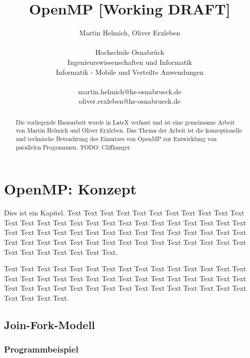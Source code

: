 \documentclass{lni}
\begin{document}
\author{
	Martin Helmich, Oliver Erxleben \\ 
	\\ 
	Hochschule Osnabrück \\ 
	Ingenieurswissenschaften und Informatik \\ 
	Informatik - Mobile und Verteilte Anwendungen \\ 
	\\ 
	martin.helmich@hs-osnabrueck.de \\
	oliver.erxleben@hs-osnabrueck.de
}

\title{OpenMP [Working DRAFT]}

\maketitle

\tableofcontents

\pagebreak %


\begin{abstract}
Die vorliegende Hausarbeit wurde in LateX verfasst und ist eine gemeinsame Arbeit von Martin Helmich und Oliver Erxleben. Das Thema der Arbeit ist die konzeptionelle und technische Betrachtung des Einsatzes von OpenMP zur Entwicklung von parallelen Programmen. TODO: Cliffhanger
\end{abstract}

\section{OpenMP: Konzept}

Dies ist ein Kapitel. Text Text Text Text Text Text Text Text Text Text Text Text Text Text Text Text Text Text Text Text Text Text Text Text Text Text Text Text Text Text Text Text Text Text Text Text Text Text Text Text Text Text Text Text Text Text Text Text Text Text Text Text Text Text Text Text Text Text Text Text Text Text Text.

Text Text Text Text Text Text Text Text Text Text Text Text Text Text Text Text Text Text Text Text Text Text Text Text Text Text Text Text Text Text Text Text Text Text Text Text Text Text Text Text Text Text Text Text Text Text Text Text Text.

\subsection{Join-Fork-Modell}
\subsubsection{Programmbeispiel}
\end{document}
